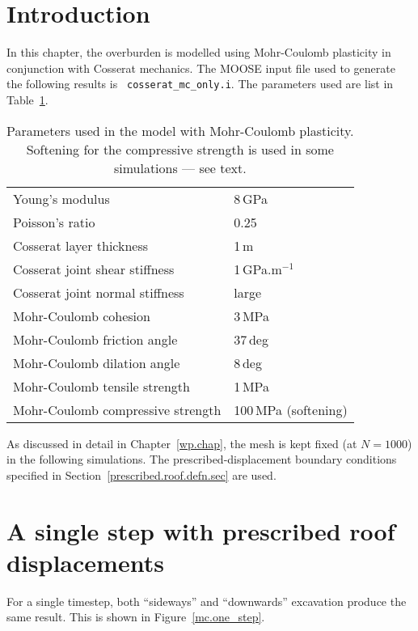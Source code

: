 \documentclass[]{scrreprt}
\begin{document}
\section{Introduction}
In this chapter, the overburden is modelled using Mohr-Coulomb
plasticity in conjunction with Cosserat mechanics.  The MOOSE input
file used to generate the following results is {\tt
  cosserat\_mc\_only.i}.  The parameters
used are list in Table~\ref{mc.params.tab}.

\begin{table}[htb]
\begin{center}
\begin{tabular}{ll}
Young's modulus & 8\,GPa \\
Poisson's ratio & 0.25 \\
Cosserat layer thickness & 1\,m \\
Cosserat joint shear stiffness & 1\,GPa.m$^{-1}$ \\
Cosserat joint normal stiffness & large \\
Mohr-Coulomb cohesion & 3\,MPa \\
Mohr-Coulomb friction angle & 37\,deg \\
Mohr-Coulomb dilation angle & 8\,deg \\
Mohr-Coulomb tensile strength & 1\,MPa \\
Mohr-Coulomb compressive strength & 100\,MPa (softening)
\end{tabular}
\caption{Parameters used in the model with Mohr-Coulomb plasticity.
  Softening for the compressive strength is used in some simulations
  --- see text.}
\label{mc.params.tab}
\end{center}
\end{table}

As discussed in detail in Chapter~\ref{wp.chap}, the mesh is kept
fixed (at $N=1000$) in the following simulations.   The
prescribed-displacement boundary conditions specified in
Section~\ref{prescribed.roof.defn.sec} are used.

\section{A single step with prescribed roof displacements}

For a single timestep, both ``sideways'' and ``downwards'' excavation
produce the same result.  This is shown in Figure~\ref{mc.one_step}.
\end{document}
